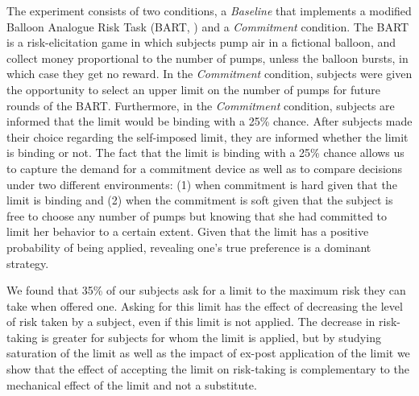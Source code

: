 \documentclass[
]{book}
\begin{document}
The experiment consists of two conditions, a \emph{Baseline} that implements a
modified Balloon Analogue Risk Task (BART, \citet{lejuez2002evaluation}) and a
\emph{Commitment} condition.
The BART is a risk-elicitation game in which subjects pump air in a fictional
balloon, and collect money proportional to the number of pumps, unless the
balloon bursts, in which case they get no reward.
In the \emph{Commitment} condition, subjects were given the opportunity to select an
upper limit on the number of pumps for future rounds of the BART.
Furthermore, in the \emph{Commitment} condition, subjects are informed that the limit
would be binding with a 25\% chance.
After subjects made their choice regarding the self-imposed limit, they are
informed whether the limit is binding or not.
The fact that the limit is binding with a 25\% chance allows us to capture the
demand for a commitment device as well as to compare decisions under two
different environments:
(1) when commitment is hard given that the limit is binding and
(2) when the commitment is soft given that the subject is free to choose any
number of pumps but knowing that she had committed to limit her behavior to a
certain extent.
Given that the limit has a positive probability of being applied, revealing
one's true preference is a dominant strategy.

We found that 35\% of our subjects ask for a limit to the maximum risk they can
take when offered one.
Asking for this limit has the effect of decreasing the level of risk taken by a
subject, even if this limit is not applied.
The decrease in risk-taking is greater for subjects for whom the limit is
applied, but by studying saturation of the limit as well as the impact of
ex-post application of the limit we show that the effect of accepting the limit
on risk-taking is complementary to the mechanical effect of the limit and not a
substitute.
\end{document}
